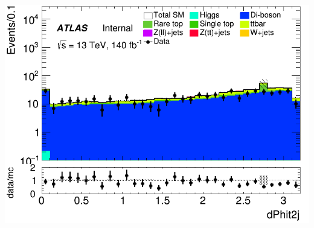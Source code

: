 \documentclass[usenames,dvipsnames]{beamer}
\begin{document}
\begin{frame}
\begin{minipage}{0.32\textwidth}
        \includegraphics[width=\textwidth]{graphics/LLL_met/LLL_met_dPhit2j.png}
    \end{minipage}
    
    \vspace{0.5cm} %


\end{frame}
\end{document}
